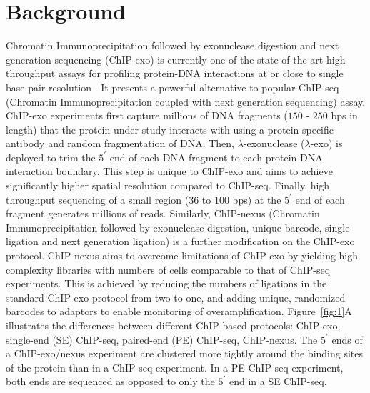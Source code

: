 \documentclass{bmcart}
\begin{document}
\begin{frontmatter}
\begin{abstractbox}
\begin{abstract}
\end{abstract}

\begin{keyword}
\end{keyword}

\end{abstractbox}

\end{frontmatter}

\newpage

\section*{Background}
\label{sec:intro}

Chromatin Immunoprecipitation followed by exonuclease digestion and next generation sequencing (ChIP-exo) is currently one of the state-of-the-art high throughput assays for profiling protein-DNA interactions at or close to single base-pair resolution \cite{exo1}. It presents a powerful alternative to popular ChIP-seq (Chromatin Immunoprecipitation coupled with next generation sequencing) assay. ChIP-exo experiments first capture millions of DNA fragments ($150$ - $250$ bps in length) that the protein under study interacts with using a protein-specific antibody and random fragmentation of DNA. Then, $\lambda$-exonuclease ($\lambda$-exo) is deployed to trim the $5^{\prime}$ end of each DNA fragment to each protein-DNA interaction boundary. This step is unique to ChIP-exo and aims to achieve significantly higher spatial resolution compared to ChIP-seq. Finally, high throughput sequencing of a small region ($36$ to $100$ bps) at the $5^{\prime}$ end of each fragment generates millions of reads. Similarly, ChIP-nexus (Chromatin Immunoprecipitation followed by exonuclease digestion, unique barcode, single ligation and next generation ligation) \cite{chipnexus} is a further modification on the ChIP-exo protocol. ChIP-nexus aims to overcome limitations of ChIP-exo by yielding high complexity libraries with numbers of cells comparable to that of ChIP-seq experiments. This is achieved by reducing the numbers of ligations in the standard ChIP-exo protocol from two to one, and adding unique, randomized barcodes to adaptors to enable monitoring of overamplification. Figure~\ref{fig:1}A illustrates the differences between different ChIP-based protocols: ChIP-exo, single-end (SE) ChIP-seq, paired-end (PE) ChIP-seq, ChIP-nexus. The $5^{\prime}$ ends of a ChIP-exo/nexus experiment are clustered more tightly around the binding sites of the protein than in a ChIP-seq experiment. In a PE ChIP-seq experiment, both ends are sequenced as opposed to only the $5^{\prime}$ end in a SE ChIP-seq.
\end{document}
